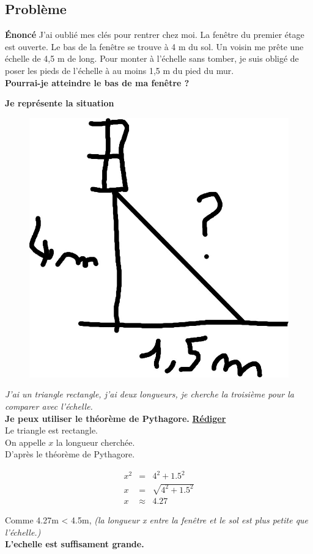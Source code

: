 \documentclass[12pt]{article}
\begin{document}
\subsection*{Problème}

\textbf{Énoncé} J'ai oublié mes clés pour rentrer chez moi. La fenêtre du premier étage est ouverte.
Le bas de la fenêtre se trouve à 4 m du sol. Un voisin me prête une échelle de 4,5 m de long.
Pour monter à l'échelle sans tomber, je suis obligé de poser les pieds de l'échelle à au moins 1,5 m du pied du mur.\\
\textbf{Pourrai-je atteindre le bas de ma fenêtre ?}

\begin{multicols}{2}

	\textbf{Je représente la situation}

	\begin{figure}[H]
		\centering
		\includegraphics[width=0.5\linewidth]{4x1-pythagore/sources/probleme.jpg}
	\end{figure}

	\textit{J'ai un triangle rectangle, j'ai deux longueurs, je cherche la troisième pour la comparer avec l'échelle.}\\
	\textbf{Je peux utiliser le théorème de Pythagore.}
	\vspace{1cm}
	\underline{\textbf{Rédiger}}\\
	Le triangle est rectangle.\\
	On appelle $x$ la longueur cherchée.\\
	D'après le théorème de Pythagore.

	\begin{eqnarray*}
		x^2 &=& 4^2 + 1.5^2 \\
		x   &=& \sqrt{4^2 + 1.5^2} \\
		x   &\approx& 4.27
	\end{eqnarray*}

	Comme 4.27m < 4.5m, \textit{(la longueur x entre la fenêtre et le sol est plus petite que l'échelle.)}\\
	\textbf{L'echelle est suffisament grande.}
\end{multicols}
\end{document}
